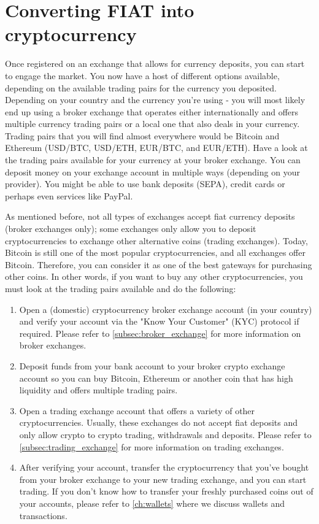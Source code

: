\section{Converting FIAT into cryptocurrency}
 Once registered on an exchange that allows for currency deposits, you can start to engage the market. You now have a host of different options available, depending on the available trading pairs for the currency you deposited. Depending on your country and the currency you're using - you will most likely end up using a broker exchange that operates either internationally and offers multiple currency trading pairs or a local one that also deals in your currency. Trading pairs that you will find almost everywhere would be Bitcoin and Ethereum (USD/BTC, USD/ETH, EUR/BTC, and EUR/ETH). Have a look at the trading pairs available for your currency at your broker exchange. You can deposit money on your exchange account in multiple ways (depending on your provider). You might be able to use bank deposits (SEPA), credit cards or perhaps even services like PayPal.\medskip

As mentioned before, not all types of exchanges accept fiat currency deposits (broker exchanges only); some exchanges only allow you to deposit cryptocurrencies to exchange other alternative coins (trading exchanges). Today, Bitcoin is still one of the most popular cryptocurrencies, and all exchanges offer Bitcoin. Therefore, you can consider it as one of the best gateways for purchasing other coins. In other words, if you want to buy any other cryptocurrencies, you must look at the trading pairs available and do the following:

\begin{enumerate}
    \item Open a (domestic) cryptocurrency broker exchange account (in your country) and verify your account via the "Know Your Customer" (KYC) protocol if required. Please refer to \cref{subsec:broker_exchange} for more information on broker exchanges.
    \item Deposit funds from your bank account to your broker crypto exchange account so you can buy Bitcoin, Ethereum or another coin that has high liquidity and offers multiple trading pairs.
    \item Open a trading exchange account that offers a variety of other cryptocurrencies. Usually, these exchanges do not accept fiat deposits and only allow crypto to crypto trading, withdrawals and deposits. Please refer to \cref{subsec:trading_exchange} for more information on trading exchanges.
    \item After verifying your account, transfer the cryptocurrency that you've bought from your broker exchange to your new trading exchange, and you can start trading. If you don't know how to transfer your freshly purchased coins out of your accounts, please refer to \cref{ch:wallets} where we discuss wallets and transactions.
\end{enumerate}


